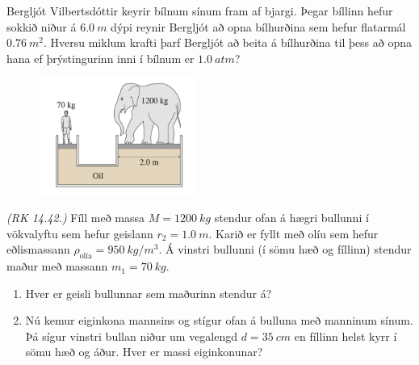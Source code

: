 \begin{enumerate}[label = \textbf{Dæmi \thechapter.\arabic*.}]
\item Bergljót Vilbertsdóttir keyrir bílnum sínum fram af bjargi. Þegar bíllinn hefur sokkið niður á $\SI{6.0}{m}$ dýpi reynir Bergljót að opna bílhurðina sem hefur flatarmál $\SI{0.76}{m^2}$. Hversu miklum krafti þarf Bergljót að beita á bílhurðina til þess að opna hana ef þrýstingurinn inni í bílnum er $\SI{1.0}{atm}$?

\vspace{0.5cm}

\begin{minipage}{\linewidth}

\begin{figure}
\vspace{-0.75cm}
\includegraphics[width=2in]{images/fill.png}
\end{figure}

\item \textit{(RK 14.42.)} Fíll með massa $M = \SI{1200}{kg}$ stendur ofan á hægri bullunni í vökvalyftu sem hefur geislann $r_2 = \SI{1.0}{m}$. Karið er fyllt með olíu sem hefur eðlismassann $\rho_{\text{olía}} = \SI{950}{kg/m^3}$. Á vinstri bullunni (í sömu hæð og fíllinn) stendur maður með massann $m_1 = \SI{70}{kg}$.

\begin{enumerate}[label = \textbf{(\alph*)}]
    \item Hver er geisli bullunnar sem maðurinn stendur á?
    \item Nú kemur eiginkona mannsins og stígur ofan á bulluna með manninum sínum. Þá sígur vinstri bullan niður um vegalengd $d = \SI{35}{cm}$ en fíllinn helst kyrr í sömu hæð og áður. Hver er massi eiginkonunar?
\end{enumerate}

\end{minipage}

\vspace{0.5cm}

\begin{minipage}{\linewidth}


\end{minipage}
\end{enumerate}
